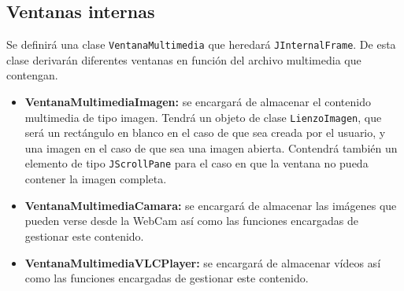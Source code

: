 \subsection{Ventanas internas}
Se definirá una clase \texttt{VentanaMultimedia} que heredará \texttt{JInternalFrame}. De esta clase derivarán diferentes ventanas en función del archivo multimedia que contengan.
\begin{itemize}
\item{\textbf{VentanaMultimediaImagen:} se encargará de almacenar el contenido multimedia de tipo imagen. Tendrá un objeto de clase \texttt{LienzoImagen}, que será un rectángulo en blanco en el caso de que sea creada por el usuario, y una imagen en el caso de que sea una imagen abierta. Contendrá también un elemento de tipo 	\texttt{JScrollPane} para el caso en que la ventana no pueda contener la imagen completa.}
\item{\textbf{VentanaMultimediaCamara:} se encargará de almacenar las imágenes que pueden verse desde la WebCam así como las funciones encargadas de gestionar este contenido.}
\item{\textbf{VentanaMultimediaVLCPlayer:} se encargará de almacenar vídeos así como las funciones encargadas de gestionar este contenido.}
\end{itemize}
